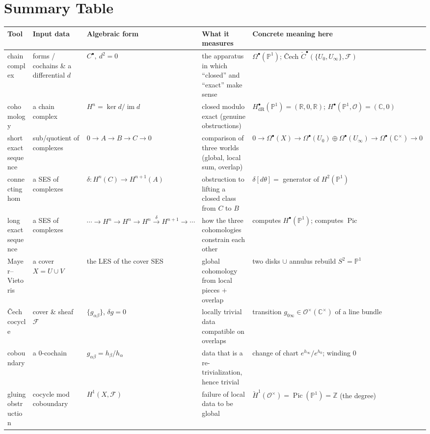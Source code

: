 \documentclass[11pt]{article}
\newcommand{\CC}{\mathbb C}
\newcommand{\RR}{\mathbb R}
\newcommand{\ZZ}{\mathbb Z}
\newcommand{\PP}{\mathbb P}
\newcommand{\OO}{\mathcal O}
\newcommand{\FF}{\mathcal F}
\newcommand{\CCech}{\check C}
\newcommand{\Hcech}{\check H}
\newcommand{\dR}{\mathrm{dR}}
\newcommand{\im}{\operatorname{im}}
\newcommand{\kerop}{\operatorname{ker}}
\newcommand{\Pic}{\operatorname{Pic}}
\theoremstyle{plain}
\theoremstyle{definition}
\begin{document}
\section{Summary Table}
\begin{center}\footnotesize
\renewcommand{\arraystretch}{1.32}
\begin{tabular}{@{}p{2.05cm} p{2.55cm} p{2.75cm} p{3.0cm} p{3.4cm}@{}}
\toprule
\textbf{Tool} & \textbf{Input data} & \textbf{Algebraic form} &
\textbf{What it measures} & \textbf{Concrete meaning here}\\
\midrule
chain complex & forms / cochains \& a differential $d$ & $C^\bullet,\ d^2=0$ &
the apparatus in which ``closed'' and ``exact'' make sense &
$\Omega^\bullet(\PP^1)$; \v Cech $\CCech^\bullet(\{U_0,U_\infty\},\FF)$\\
cohomology & a chain complex & $H^n=\kerop d/\im d$ &
closed modulo exact (genuine obstructions) &
$H^\bullet_\dR(\PP^1)=(\RR,0,\RR)$; $H^\bullet(\PP^1,\OO)=(\CC,0)$\\
short exact sequence & sub/quotient of complexes & $0\!\to\!A\!\to\!B\!\to\!C\!\to\!0$ &
comparison of three worlds (global, local sum, overlap) &
$0\!\to\!\Omega^\bullet(X)\!\to\!\Omega^\bullet(U_0)\!\oplus\!\Omega^\bullet(U_\infty)\!\to\!\Omega^\bullet(\CC^\times)\!\to\!0$\\
connecting hom & a SES of complexes & $\delta\colon H^n(C)\!\to\!H^{n+1}(A)$ &
obstruction to lifting a closed class from $C$ to $B$ &
$\delta[d\theta]=$ generator of $H^2(\PP^1)$\\
long exact sequence & a SES of complexes & $\cdots\!\to\!H^n\!\to\!H^n\!\to\!H^n\!\xrightarrow{\delta}\!H^{n+1}\!\to\!\cdots$ &
how the three cohomologies constrain each other &
computes $H^\bullet(\PP^1)$; computes $\Pic$\\
Mayer--Vietoris & a cover $X=U\cup V$ & the LES of the cover SES &
global cohomology from local pieces $+$ overlap &
two disks $\cup$ annulus rebuild $S^2=\PP^1$\\
\v Cech cocycle & cover \& sheaf $\FF$ & $\{g_{\alpha\beta}\}$, $\delta g=0$ &
locally trivial data compatible on overlaps &
transition $g_{0\infty}\in\OO^\times(\CC^\times)$ of a line bundle\\
coboundary & a $0$-cochain & $g_{\alpha\beta}=h_\beta/h_\alpha$ &
data that is a re-trivialization, hence trivial &
change of chart $e^{h_\infty}/e^{h_0}$; winding $0$\\
gluing obstruction & cocycle mod coboundary & $H^1(X,\FF)$ &
failure of local data to be global &
$\Hcech^1(\OO^\times)=\Pic(\PP^1)=\ZZ$ (the degree)\\
\bottomrule
\end{tabular}
\end{center}
\end{document}
